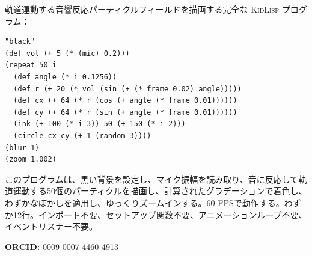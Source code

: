\documentclass[10pt,letterpaper,twocolumn]{article}
\newcommand{\kl}{\textsc{KidLisp}}
\begin{document}
軌道運動する音響反応パーティクルフィールドを描画する完全な \kl{} プログラム：

\begin{lstlisting}
"black"
(def vol (+ 5 (* (mic) 0.2)))
(repeat 50 i
  (def angle (* i 0.1256))
  (def r (+ 20 (* vol (sin (+ (* frame 0.02) angle)))))
  (def cx (+ 64 (* r (cos (+ angle (* frame 0.01))))))
  (def cy (+ 64 (* r (sin (+ angle (* frame 0.01))))))
  (ink (+ 100 (* i 3)) 50 (+ 150 (* i 2)))
  (circle cx cy (+ 1 (random 3))))
(blur 1)
(zoom 1.002)
\end{lstlisting}

このプログラムは、黒い背景を設定し、マイク振幅を読み取り、音に反応して軌道運動する50個のパーティクルを描画し、計算されたグラデーションで着色し、わずかなぼかしを適用し、ゆっくりズームインする。60 FPSで動作する。わずか12行。インポート不要、セットアップ関数不要、アニメーションループ不要、イベントリスナー不要。

\vspace{0.5em}
\noindent\textbf{ORCID:} \href{https://orcid.org/0009-0007-4460-4913}{0009-0007-4460-4913}



\end{document}
